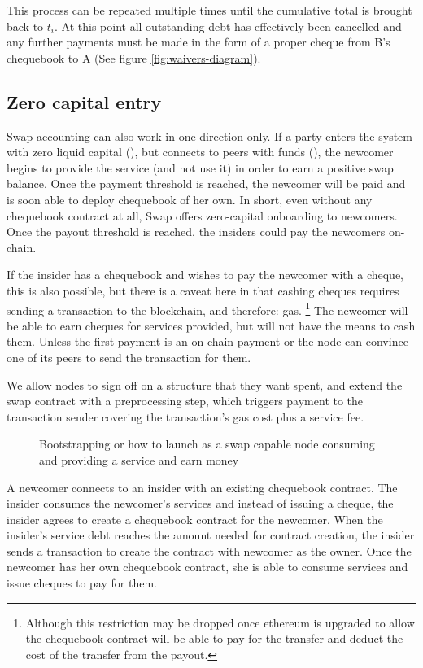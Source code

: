 This process can be repeated multiple times until the cumulative total is brought back to $t_i$. At this point all outstanding debt has effectively been cancelled and any further payments must be made in the form of a proper cheque from B's chequebook to A (See figure \ref{fig:waivers-diagram}).


\subsection{Zero capital entry}\label{sec:zero-capital-entry}

Swap accounting can also work in one direction only. If a party enters the system with zero liquid capital (), but connects to peers with funds (), the newcomer begins to provide the service (and not use it) in order to earn a positive swap balance. Once the payment threshold is reached, the newcomer will be paid and is soon able to deploy chequebook of her own.
In short, even without any chequebook contract at all, Swap offers zero-capital onboarding to newcomers. Once the payout threshold is reached, the insiders could pay the newcomers on-chain. 

If the insider has a chequebook and wishes to pay the newcomer with a cheque, this is also possible, but there is a caveat here in that cashing cheques requires sending a transaction to the blockchain, and therefore: gas.%
%
\footnote{Although this restriction may be dropped once ethereum is upgraded to allow the chequebook contract will be able to pay for the transfer and deduct the cost of the transfer from the payout.}
%
The newcomer will be able to earn cheques for services provided, but will not have the means to cash them. 
Unless the first payment is an on-chain payment or the node can convince one of its peers to send the transaction for them.

We allow nodes to sign off on a structure that they want spent, and extend the swap contract with a preprocessing step, which triggers payment to the transaction sender covering the transaction's gas cost plus a service fee. 



\begin{figure}[htbp]
\centering

\caption{Bootstrapping or how to launch as a swap capable node consuming and providing a
service and earn money}
\label{fig:zero-cost-entry}
\end{figure}

  
A newcomer connects to  an insider with an existing chequebook contract. The insider consumes the newcomer's services and instead of issuing a cheque, the insider agrees to create a chequebook contract for the newcomer. When the insider's service debt reaches the amount needed for contract creation, the insider sends a transaction to create the contract with newcomer as the owner. Once the newcomer has her own chequebook contract, she is able to consume services and issue cheques to pay for them.
 
